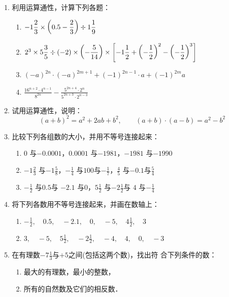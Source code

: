 \begin{enumerate}
	\item 利用运算通性，计算下列各题：
	\begin{enumerate}
		\item $-1\dfrac{2}{3}\times \left(0.5-\dfrac{2}{3}\right)\div 1\dfrac{1}{9}$
		\item $2^3\times 5\dfrac{3}{5}\div (-2)\times\left(-\dfrac{5}{14}\right)\times \left[-1\dfrac{1}{2}+\left(-\dfrac{1}{2}\right)^2-\left(-\dfrac{1}{2}\right)^3\right]$
		\item $(-a)^{2n}\cdot (-a)^{2m+1}+(-1)^{2n-1}\cdot a+(-1)^{2m}a$
		\item $\frac{16^{n+2}\cdot 4^{n-1}}{8^{2n}}-\frac{5^{2n+4}\cdot 2^n}{5^{2n+3}\cdot 2^{n-3}}$
	\end{enumerate}
	
	\item 试用运算通性，说明：
	\[(a+b)^2=a^2+2ab+b^2,\qquad (a+b)\cdot (a-b)=a^2-b^2 \]
	\item 比较下列各组数的大小，并用不等号连接起来：
	\begin{enumerate}
		\item $0$ 与$-0.0001$，\quad $0.0001$ 与$-1981$，\quad $-1981$ 与$-1990$ 
		\item $-1\frac{2}{3}$ 与$-1\frac{5}{8}$，\quad $-\frac{1}{4}$ 与$100$与$-\frac{1}{7}$，\quad $\frac{4}{5}$ 与$-0.1$与$\frac{5}{4}$
		\item  $-\frac{1}{2}$ 与$0.5$与 $-2.1$ 与$0$，\quad $5\frac{1}{2}$ 与$-2\frac{1}{2}$与 $4$ 与$-\frac{1}{4}$ 
	\end{enumerate}
	
	\item 将下列各数用不等号连接起来，并画在数轴上：
	\begin{enumerate}
		\item $-\frac{1}{2},\quad  0.5 ,\quad -2.1  ,\quad 0  ,\quad -5  ,\quad  4\frac{1}{2} ,\quad 3  $
		\item $3,\quad  -5 ,\quad 5\frac{1}{2}  ,\quad  -2\frac{1}{2} ,\quad  -4 ,\quad  4 ,\quad  0 ,\quad  -3 $
	\end{enumerate}
	
	\item  在有理数$-7\frac{1}{3}$与$+5$之间(包括这两个数)，找出符
	合下列条件的数：
	\begin{enumerate}
		\item 最大的有理数，最小的整数，
		\item 所有的自然数及它们的相反数．
	\end{enumerate}
	

\end{enumerate}
